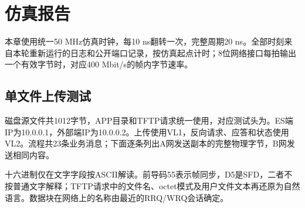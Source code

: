 \chapter{仿真报告}

本章使用统一50 MHz仿真时钟，每10 ns翻转一次，完整周期20 ns。全部时刻来自本轮重新运行的日志和公开端口记录，按仿真起点计时；8位网络接口每拍输出一个有效字节时，对应400 Mbit/s的帧内字节速率。

\section{单文件上传测试}

磁盘源文件共1012字节，APP目录和TFTP请求统一使用，对应测试头为。ES端IP为10.0.0.1，外部端IP为10.0.0.2。上传使用VL1，反向请求、应答和状态使用VL2。流程共23条业务消息；下面逐条列出A网发送副本的完整物理字节，B网发送相同内容。

十六进制仅在文字字段按ASCII解读。前导码55表示帧同步，D5是SFD，二者不按普通文字解释；TFTP请求中的文件名、octet模式及用户文件文本再还原为自然语言。数据块在网络上的名称由最近的RRQ/WRQ会话确定。

